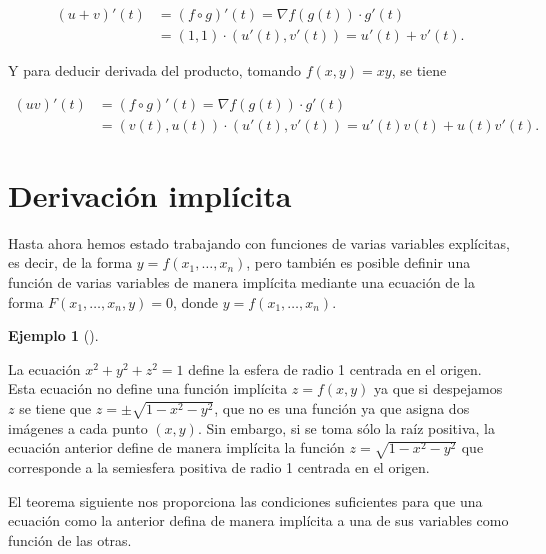 \documentclass[
  a4paper,
]{scrreport}
\theoremstyle{definition}
\theoremstyle{plain}
\theoremstyle{plain}
\theoremstyle{definition}
\theoremstyle{definition}
\newtheorem{example}{Ejemplo}[chapter]
\theoremstyle{plain}
\theoremstyle{remark}
\begin{document}
\begin{align*}
(u+v)'(t) 
&= (f\circ g)'(t) = \nabla f(g(t))\cdot g'(t) \\
&= (1,1)\cdot (u'(t),v'(t)) = u'(t)+v'(t).
\end{align*}

Y para deducir derivada del producto, tomando \(f(x,y)=xy\), se tiene

\begin{align*}
(uv)'(t) 
&= (f\circ g)'(t) = \nabla f(g(t))\cdot g'(t) \\
&= (v(t),u(t))\cdot (u'(t),v'(t)) = u'(t)v(t)+u(t)v'(t).
\end{align*}

\hypertarget{derivaciuxf3n-impluxedcita}{%
\section{Derivación implícita}\label{derivaciuxf3n-impluxedcita}}

Hasta ahora hemos estado trabajando con funciones de varias variables
explícitas, es decir, de la forma \(y=f(x_1,\ldots,x_n)\), pero también
es posible definir una función de varias variables de manera implícita
mediante una ecuación de la forma \(F(x_1,\ldots,x_n, y)=0\), donde
\(y=f(x_1,\ldots,x_n)\).

\begin{example}[]\protect\hypertarget{exm-funcion-implicita-2-variables}{}\label{exm-funcion-implicita-2-variables}

La ecuación \(x^2+y^2+z^2 = 1\) define la esfera de radio 1 centrada en
el origen. Esta ecuación no define una función implícita \(z=f(x,y)\) ya
que si despejamos \(z\) se tiene que \(z=\pm\sqrt{1-x^2-y^2}\), que no
es una función ya que asigna dos imágenes a cada punto \((x,y)\). Sin
embargo, si se toma sólo la raíz positiva, la ecuación anterior define
de manera implícita la función \(z=\sqrt{1-x^2-y^2}\) que corresponde a
la semiesfera positiva de radio 1 centrada en el origen.

\end{example}

El teorema siguiente nos proporciona las condiciones suficientes para
que una ecuación como la anterior defina de manera implícita a una de
sus variables como función de las otras.
\end{document}
